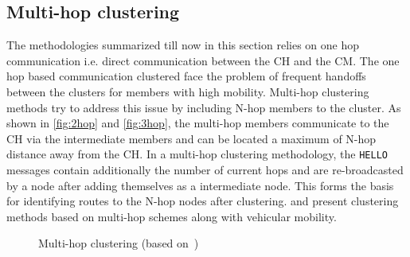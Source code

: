 \documentclass[]{ccs-thesis}
\begin{document}
\subsection{Multi-hop clustering}

The methodologies summarized till now in this section relies on one hop communication i.e. direct communication between
the \ac{CH} and the \ac{CM}. The one hop based communication clustered face the problem of frequent handoffs between
the clusters for members with high mobility. Multi-hop clustering methods try to address this issue by including N-hop
members to the cluster. As shown in \ref{fig:2hop} and \ref{fig:3hop}, the multi-hop members communicate to the \ac{CH}
via the intermediate members and can be located a maximum of N-hop distance away from the \ac{CH}. In a multi-hop
clustering methodology, the \texttt{HELLO} messages contain additionally the number of current hops and are re-broadcasted
by a node after adding themselves as a intermediate node. This forms the basis for identifying routes to the N-hop nodes
after clustering. \textcite{Zhang2069135} and \textcite{6554933} present clustering methods based on multi-hop schemes
along with vehicular mobility.


\begin{figure}[h]%
    \centering
    \hfill%
    \hfill%
    \caption{Multi-hop clustering (based on~\cite[Figure~1]{6554933})}%
    \label{fig:multihop}%
\end{figure}
\end{document}
